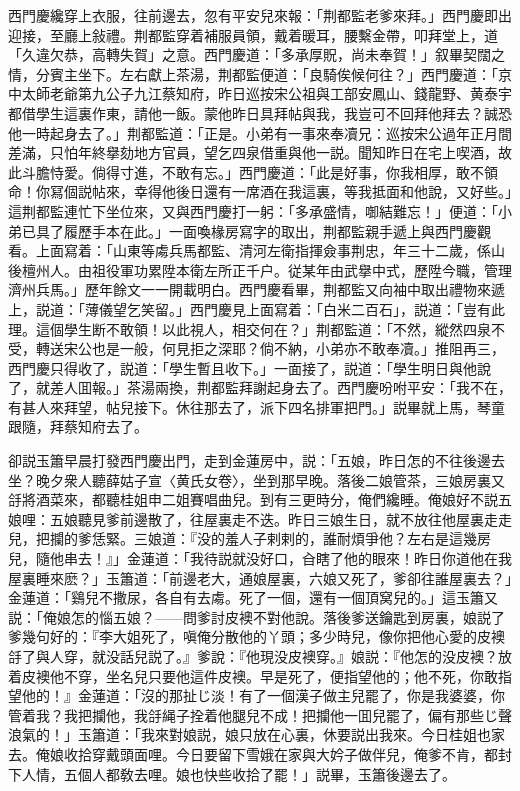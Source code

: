 西門慶纔穿上衣服，往前邊去，忽有平安兒來報：「荆都監老爹來拜。」西門慶即出迎接，至廳上敍禮。荆都監穿着補服員領，戴着暖耳，腰繫金帶，叩拜堂上，道「久違欠恭，高轉失賀」之意。西門慶道：「多承厚貺，尚未奉賀！」叙畢契闊之情，分賓主坐下。左右獻上茶湯，荆都監便道：「良騎俟候何往？」西門慶道：「京中太師老爺第九公子九江蔡知府，昨日巡按宋公祖與工部安鳳山、錢龍野、黄泰宇都借學生這裏作東，請他一飯。蒙他昨日具拜帖與我，我豈可不回拜他拜去？誠恐他一時起身去了。」荆都監道：「正是。小弟有一事來奉凟兄：巡按宋公過年正月間差滿，只怕年終擧劾地方官員，望乞四泉借重與他一説。聞知昨日在宅上喫酒，故此斗膽恃愛。倘得寸進，不敢有忘。」西門慶道：「此是好事，你我相厚，敢不領命！你冩個説帖來，幸得他後日還有一席酒在我這裏，等我抵面和他說，又好些。」這荆都監連忙下坐位來，又與西門慶打一躬：「多承盛情，啣結難忘！」便道：「小弟已具了履歷手本在此。」一面喚椽房寫字的取出，荆都監親手遞上與西門慶觀看。上面寫着：「山東等䖏兵馬都監、清河左衛指揮僉事荆忠，年三十二歲，係山後檀州人。由祖役軍功累陞本衛左所正千户。従某年由武擧中式，歷陞今職，管理濟州兵馬。」歷年餘文一一開載明白。西門慶看畢，荆都監又向袖中取出禮物來遞上，説道：「薄儀望乞笑留。」西門慶見上面寫着：「白米二百石」，説道：「豈有此理。這個學生断不敢領！以此視人，相交何在？」荆都監道：「不然，縱然四泉不受，轉送宋公也是一般，何見拒之深耶？倘不納，小弟亦不敢奉凟。」推阻再三，西門慶只得收了，説道：「學生暫且收下。」一面接了，説道：「學生明日與他說了，就差人囬報。」茶湯兩換，荆都監拜謝起身去了。西門慶吩咐平安：「我不在，有甚人來拜望，帖兒接下。休往那去了，派下四名排軍把門。」説畢就上馬，琴童跟隨，拜蔡知府去了。

卻説玉簫早晨打發西門慶出門，走到金蓮房中，説：「五娘，昨日怎的不往後邊去坐？晚夕衆人聽薛姑子宣〈黄氏女卷〉，坐到那早晚。落後二娘管茶，三娘房裏又㧱將酒菜來，都聽桂姐申二姐賽唱曲兒。到有三更時分，俺們纔睡。俺娘好不説五娘哩：五娘聽見爹前邊散了，往屋裏走不迭。昨日三娘生日，就不放往他屋裏走走兒，把攔的爹恁緊。三娘道：『没的羞人子剌剌的，誰耐煩爭他？左右是這幾房兒，隨他串去！』」金蓮道：「我待説就没好口，㒲瞎了他的眼來！昨日你道他在我屋裏睡來麽？」玉簫道：「前邊老大，通娘屋裏，六娘又死了，爹卻往誰屋裏去？」金蓮道：「鷄兒不撒尿，各自有去䖏。死了一個，還有一個頂窝兒的。」這玉簫又説：「俺娘怎的惱五娘？——問爹討皮襖不對他說。落後爹送鑰匙到房裏，娘説了爹幾句好的：『李大姐死了，嗔俺分散他的丫頭；多少時兒，像你把他心愛的皮襖㧱了與人穿，就没話兒説了。』爹說：『他現没皮襖穿。』娘説：『他怎的没皮襖？放着皮襖他不穿，坐名兒只要他這件皮襖。早是死了，便指望他的；他不死，你敢指望他的！』金蓮道：「沒的那扯じ淡！有了一個漢子做主兒罷了，你是我婆婆，你管着我？我把攔他，我㧱䋲子拴着他腿兒不成！把攔他一囬兒罷了，偏有那些じ聲浪氣的！」玉簫道：「我來對娘説，娘只放在心裏，休要説出我來。今日桂姐也家去。俺娘收拾穿戴頭面哩。今日要留下雪娥在家與大妗子做伴兒，俺爹不肯，都封下人情，五個人都敎去哩。娘也快些收拾了罷！」説畢，玉簫後邊去了。

